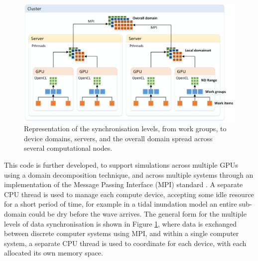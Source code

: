 \begin{figure}[tpb]
	\centering
	\includegraphics[width=1.0\textwidth]{mpi-figures/sync-levels.png}
	\caption{Representation of the synchronisation levels, from work groups, to device domains, servers, and the overall domain spread across several computational nodes.}
	\label{Software_Sync_Levels}
\end{figure}

This code is further developed, to support simulations across multiple GPUs using a domain decomposition technique, and across multiple systems through an implementation of the Message Passing Interface (MPI) standard \citep{MPI2009}. A separate CPU thread is used to manage each compute device, accepting some idle resource for a short period of time, for example in a tidal inundation model an entire sub-domain could be dry before the wave arrives. The general form for the multiple levels of data synchronisation is shown in Figure \ref{Software_Sync_Levels}, where data is exchanged between discrete computer systems using MPI, and within a single computer system, a separate CPU thread is used to coordinate for each device, with each allocated its own memory space.

